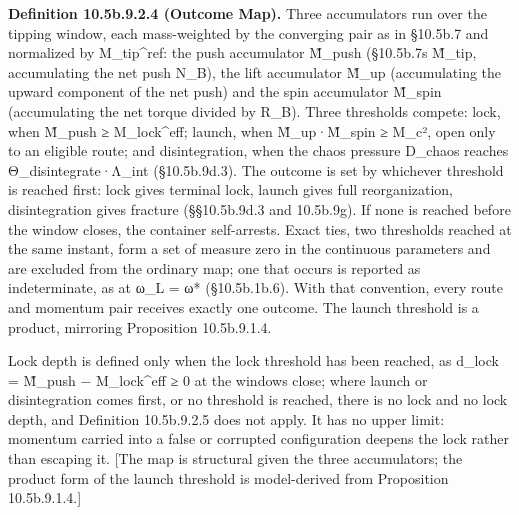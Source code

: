 \documentclass[
]{article}
\begin{document}
\textbf{Definition 10.5b.9.2.4 (Outcome Map).} Three accumulators run
over the tipping window, each mass-weighted by the converging pair as in
§10.5b.7 and normalized by M\_tip\^{}ref: the push accumulator M̃\_push
(§10.5b.7\textquotesingle s M̃\_tip, accumulating the net push N\_B), the
lift accumulator M̃\_up (accumulating the upward component of the net
push) and the spin accumulator M̃\_spin (accumulating the net torque
divided by R\_B). Three thresholds compete: lock, when M̃\_push ≥
M\_lock\^{}eff; launch, when M̃\_up·M̃\_spin ≥ M\_c², open only to an
eligible route; and disintegration, when the chaos pressure D\_chaos
reaches Θ\_disintegrate·Λ\_int (§10.5b.9d.3). The outcome is set by
whichever threshold is reached first: lock gives terminal lock, launch
gives full reorganization, disintegration gives fracture (§§10.5b.9d.3
and 10.5b.9g). If none is reached before the window closes, the
container self-arrests. Exact ties, two thresholds reached at the same
instant, form a set of measure zero in the continuous parameters and are
excluded from the ordinary map; one that occurs is reported as
indeterminate, as at ω\_L = ω* (§10.5b.1b.6). With that convention,
every route and momentum pair receives exactly one outcome. The launch
threshold is a product, mirroring Proposition 10.5b.9.1.4.

Lock depth is defined only when the lock threshold has been reached, as
d\_lock = M̃\_push − M\_lock\^{}eff ≥ 0 at the window\textquotesingle s
close; where launch or disintegration comes first, or no threshold is
reached, there is no lock and no lock depth, and Definition 10.5b.9.2.5
does not apply. It has no upper limit: momentum carried into a false or
corrupted configuration deepens the lock rather than escaping it. {[}The
map is structural given the three accumulators; the product form of the
launch threshold is model-derived from Proposition 10.5b.9.1.4.{]}
\end{document}
